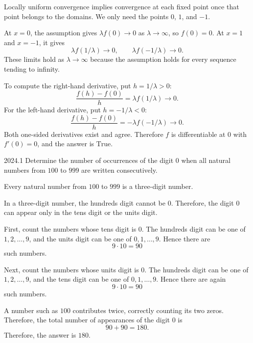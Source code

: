     \begin{solution}
Locally uniform convergence implies convergence at each fixed point
        once that point belongs to the domains. We only need the points
        $0$, $1$, and $-1$.

        At $x=0$, the assumption gives $\lambda f(0)\to0$ as
        $\lambda\to\infty$, so $f(0)=0$. At $x=1$ and $x=-1$, it gives
        \[
            \lambda f(1/\lambda)\to0,
            \qquad
            \lambda f(-1/\lambda)\to0.
        \]
        These limits hold as $\lambda\to\infty$ because the assumption holds
        for every sequence tending to infinity.

        To compute the right-hand derivative, put $h=1/\lambda>0$:
        \[
            \frac{f(h)-f(0)}{h}
            =\lambda f(1/\lambda)\longrightarrow0.
        \]
        For the left-hand derivative, put $h=-1/\lambda<0$:
        \[
            \frac{f(h)-f(0)}{h}
            =-\lambda f(-1/\lambda)\longrightarrow0.
        \]
        Both one-sided derivatives exist and agree. Therefore $f$ is
        differentiable at $0$ with $f'(0)=0$, and the answer is
        $\boxed{\text{True}}$.
    \end{solution}

    \begin{pastproblem}{2024.1}
        Determine the number of occurrences of the digit $0$ when all natural numbers from $100$ to
        $999$ are written consecutively.
    \end{pastproblem}

    \begin{solution}
        Every natural number from $100$ to $999$ is a three-digit number.

        In a three-digit number, the hundreds digit cannot be $0$. Therefore, the digit $0$ can
        appear only in the tens digit or the units digit.

        First, count the numbers whose tens digit is $0$. The hundreds digit can be one of
        $1,2,\dots,9$, and the units digit can be one of $0,1,\dots,9$. Hence there are
        \[
            9\cdot 10=90
        \]
        such numbers.

        Next, count the numbers whose units digit is $0$. The hundreds digit can be one of
        $1,2,\dots,9$, and the tens digit can be one of $0,1,\dots,9$. Hence there are again
        \[
            9\cdot 10=90
        \]
        such numbers.

        A number such as $100$ contributes twice, correctly counting its two zeros. Therefore, the total number of appearances of the digit $0$ is
        \[
            90+90=180.
        \]
        Therefore, the answer is $\boxed{180}$.
    \end{solution}

